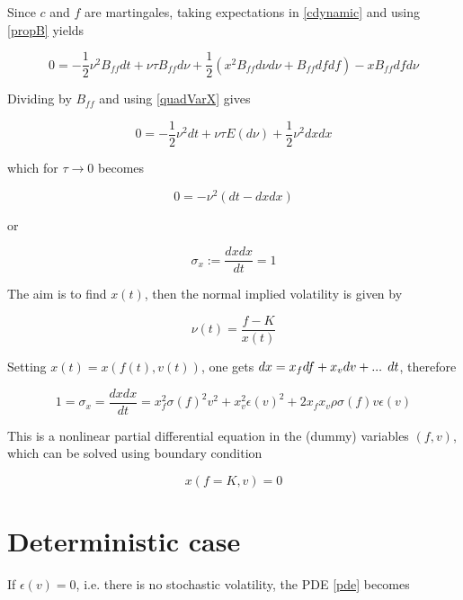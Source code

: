 \documentclass{amsart}
\theoremstyle{plain}
\numberwithin{equation}{section}
\begin{document}
Since $c$ and $f$ are martingales, taking expectations in \ref{cdynamic} and using \ref{propB} yields

\begin{equation}
0 = -\frac{1}{2} \nu^2 B_{ff} dt + \nu \tau B_{ff} d\nu  + \frac{1}{2} \left( x^2 B_{ff} d\nu d\nu + B_{ff} df df \right)
       - x B_{ff} df d\nu
\end{equation}

Dividing by $B_{ff}$ and using \ref{quadVarX} gives

\begin{equation}
0 = -\frac{1}{2} \nu^2 dt + \nu \tau E(d\nu) + \frac{1}{2} \nu^2 dx dx 
\end{equation}

which for $\tau \rightarrow 0$ becomes

\begin{equation}
0 = - \nu^2 ( dt - dx dx )
\end{equation}

or

\begin{equation}
\sigma_x := \frac{dx dx}{dt} = 1
\end{equation}

The aim is to find $x(t)$, then the normal implied volatility is given by

\begin{equation}
\nu(t) = \frac{f-K}{x(t)} 
\end{equation}

Setting $x(t) = x(f(t),v(t))$, one gets $dx=x_fdf+x_vdv+\textnormal{... }dt$, therefore

\begin{equation}\label{pde}
1 = \sigma_x = \frac{dx dx}{dt} = x_f^2\sigma(f)^2v^2+x_v^2\epsilon(v)^2+2x_fx_v\rho\sigma(f) v \epsilon(v)
\end{equation}

This is a nonlinear partial differential equation in the (dummy) variables $(f,v)$, which can be solved using boundary condition

\begin{equation}
x(f=K,v) = 0
\end{equation}

\section{Deterministic case}

If $\epsilon(v)=0$, i.e. there is no stochastic volatility, the PDE \ref{pde} becomes
\end{document}
